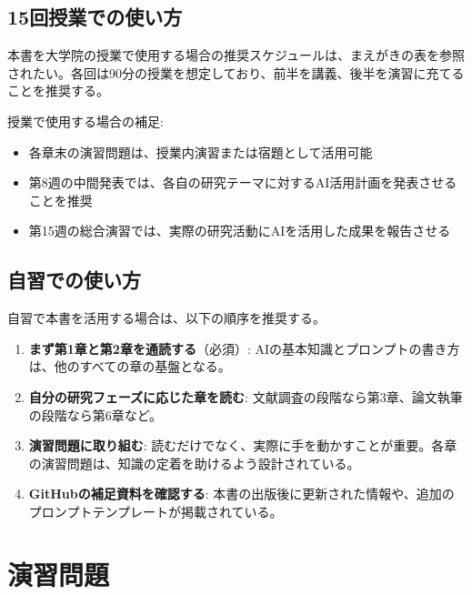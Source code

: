 \subsection{15回授業での使い方}

本書を大学院の授業で使用する場合の推奨スケジュールは、まえがきの表を参照されたい。各回は90分の授業を想定しており、前半を講義、後半を演習に充てることを推奨する。

授業で使用する場合の補足:
\begin{itemize}
\item 各章末の演習問題は、授業内演習または宿題として活用可能
\item 第8週の中間発表では、各自の研究テーマに対するAI活用計画を発表させることを推奨
\item 第15週の総合演習では、実際の研究活動にAIを活用した成果を報告させる
\end{itemize}

\subsection{自習での使い方}

自習で本書を活用する場合は、以下の順序を推奨する。

\begin{enumerate}
\item \textbf{まず第1章と第2章を通読する}（必須）: AIの基本知識とプロンプトの書き方は、他のすべての章の基盤となる。
\item \textbf{自分の研究フェーズに応じた章を読む}: 文献調査の段階なら第3章、論文執筆の段階なら第6章など。
\item \textbf{演習問題に取り組む}: 読むだけでなく、実際に手を動かすことが重要。各章の演習問題は、知識の定着を助けるよう設計されている。
\item \textbf{GitHubの補足資料を確認する}: 本書の出版後に更新された情報や、追加のプロンプトテンプレートが掲載されている。
\end{enumerate}

\section*{演習問題}

